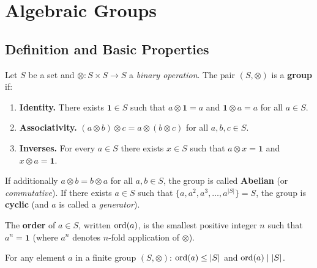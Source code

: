 \documentclass[11pt]{article}
\begin{document}
\section{Algebraic Groups}

\subsection{Definition and Basic Properties}

\begin{definition}[Group]
  Let $S$ be a set and $\otimes : S \times S \to S$ a \emph{binary
  operation}.  The pair $(S, \otimes)$ is a \textbf{group} if:
  \begin{enumerate}[label=(\roman*)]
    \item \textbf{Identity.} There exists $\mathbf{1} \in S$ such that
      $a \otimes \mathbf{1} = a$ and $\mathbf{1} \otimes a = a$ for all
      $a \in S$.
    \item \textbf{Associativity.} $(a \otimes b) \otimes c = a \otimes
      (b \otimes c)$ for all $a,b,c \in S$.
    \item \textbf{Inverses.} For every $a \in S$ there exists $x \in S$
      such that $a \otimes x = \mathbf{1}$ and $x \otimes a = \mathbf{1}$.
  \end{enumerate}
  If additionally $a \otimes b = b \otimes a$ for all $a, b \in S$, the
  group is called \textbf{Abelian} (or \emph{commutative}).
  If there exists $a \in S$ such that
  $\{a, a^2, a^3, \ldots, a^{|S|}\} = S$, the group is \textbf{cyclic}
  (and $a$ is called a \emph{generator}).
\end{definition}

\begin{definition}
  The \textbf{order} of $a \in S$, written $\operatorname{ord}(a)$, is the smallest
  positive integer $n$ such that $a^n = \mathbf{1}$ (where $a^n$ denotes
  $n$-fold application of $\otimes$).
\end{definition}

\begin{fact}
  For any element $a$ in a finite group $(S, \otimes)$:
  $\operatorname{ord}(a) \leq |S|$ and $\operatorname{ord}(a) \mid |S|$.
\end{fact}
\end{document}
